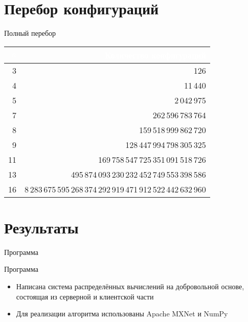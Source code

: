 \documentclass[8pt, hyperref={pdftex,unicode}, green]{beamer}
\begin{document}
\section{Перебор конфигураций}
\begin{frame}{Полный перебор}

    \centering
    \begin{tabular}{|r|r|}\hline
        \rowcolor{green}\textcolor{white}{\;$n$\;} &\bf \textcolor{white}{Количество конфигураций} \\ \hline
        3 & 126 \\ \hline
        4 & 11\,440 \\ \hline
        5 & 2\,042\,975 \\ \hline
        7 & 262\,596\,783\,764 \\ \hline
        8 & 159\,518\,999\,862\,720 \\ \hline
        9 & 128\,447\,994\,798\,305\,325 \\ \hline
        11 & 169\,758\,547\,725\,351\,091\,518\,726 \\ \hline
        13 & 495\,874\,093\,230\,232\,452\,749\,553\,398\,586 \\ \hline
        16 & 8\,283\,675\,595\,268\,374\,292\,919\,471\,912\,522\,442\,632\,960 \\ \hline
    \end{tabular}

\end{frame} 


\section{Результаты}
\begin{frame}{Программа}

    \begin{block}{Программа}
        \begin{itemize}
            \item Написана система распределённых вычислений на добровольной основе, состоящая из серверной и клиентской части
            \item Для реализации алгоритма использованы Apache MXNet и NumPy
        \end{itemize}
    \end{block}
  
\end{frame} 
\end{document}
